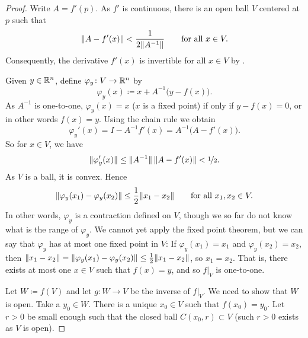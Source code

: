 \begin{proof}
Write $A = f'(p)$.  As $f'$ is continuous, there is an open ball
$V$ centered at $p$ such that
\begin{equation*}
\lVert {A-f'(x)} \rVert < \frac{1}{2\lVert {A^{-1}} \rVert}
\qquad \text{for all } x \in V.
\end{equation*}
Consequently, the derivative $f'(x)$ is invertible for all $x \in V$
by .

Given $y \in {\mathbb{R}}^n$, define $\varphi_y \colon V \to {\mathbb{R}}^n$ by
\begin{equation*}
\varphi_y (x) \coloneqq x + A^{-1}\bigl(y-f(x)\bigr) .
\end{equation*}
As $A^{-1}$ is one-to-one,
$\varphi_y(x) = x$ ($x$ is a fixed point) if only if
$y-f(x) = 0$, or in other words $f(x)=y$.  Using the chain rule we obtain
\begin{equation*}
\varphi_y'(x) = I - A^{-1} f'(x) = A^{-1} \bigl( A-f'(x) \bigr) .
\end{equation*}
So for $x \in V$, we have
\begin{equation*}
\lVert {\varphi_y'(x)} \rVert \leq \lVert {A^{-1}} \rVert \, \lVert {A-f'(x)} \rVert < \nicefrac{1}{2} .
\end{equation*}
As $V$ is a ball, it is convex.  Hence
\begin{equation*}
\lVert {\varphi_y(x_1)-\varphi_y(x_2)} \rVert \leq \frac{1}{2} \lVert {x_1-x_2} \rVert 
\qquad
\text{for all } x_1,x_2 \in V.
\end{equation*}
In other words, $\varphi_y$ is a contraction defined on $V$, though we so far
do not know what is the range of $\varphi_y$.  We cannot yet
apply the fixed
point theorem, but we can say that $\varphi_y$ 
has at most one fixed point in $V$:
If $\varphi_y(x_1) = x_1$ and
$\varphi_y(x_2) = x_2$, then
$\lVert {x_1-x_2} \rVert = \lVert {\varphi_y(x_1)-\varphi_y(x_2)} \rVert \leq
\frac{1}{2} \lVert {x_1-x_2} \rVert$, so $x_1 = x_2$.
That is, there exists at most one $x \in V$
such that $f(x) = y$, and so $f|_V$ is one-to-one.

Let $W \coloneqq f(V)$ and let $g \colon W \to V$ be the inverse of $f|_V$.
We need to show that $W$ is open.  Take a $y_0 \in W$.
There is a unique $x_0 \in V$ such that $f(x_0) = y_0$.
Let $r > 0$ be small enough such that the closed ball $C(x_0,r) \subset V$
(such $r > 0$ exists as $V$ is open).


\end{proof}
